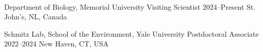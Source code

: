 \\


\begin{cventries}




\cventry
    {Department of Biology, Memorial University} %
    {Visiting Scientist} %
    {2024--Present} %
    {St. John's, NL, Canada} %
    {}


\cventry
    {Schmitz Lab, School of the Environment, Yale University} %
    {Postdoctoral Associate} %
    {2022--2024} %
    {New Haven, CT, USA} %
    {}



\end{cventries}
